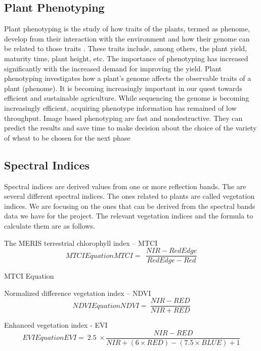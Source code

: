 \documentclass[sigconf, nonacm, natbib, screen, balance=False]{acmart}
\begin{document}
\subsection{Plant Phenotyping}\label{sec:plant_pheno}

Plant phenotyping is the study of how traits of the plants, termed as phenome, develop from their interaction with the environment and how their genome can be related to those traits \cite{minervini}. These traits include, among others, the plant yield, maturity time, plant height, etc. The importance of phenotyping has increased significantly with the increased demand for improving the yield.
Plant phenotyping investigates how a plant's genome affects the observable traits of a plant (phenome). It is becoming increasingly important in our quest towards efficient and sustainable agriculture. While sequencing the genome is becoming increasingly efficient, acquiring phenotype information has remained of low throughput. 
Image based phenotyping are fast and nondestructive. They can predict the results and save time to make decision about the choice of the variety of wheat to be chosen for the next phase

\subsection{Spectral Indices}\label{sec:aspect1}

Spectral indices are derived values from one or more reflection bands. The are several different spectral indices. The ones related to plants are called vegetation indices. We are focusing on the ones that can be derived from the spectral bands data we have for the project. The relevant vegetation indices and the formula to calculate them are as follows.

	The MERIS terrestrial chlorophyll index – MTCI
\begin{displaymath}
  \caption{MTCI Equation}
  \label{eq:mtci}
MTCI=\ \ \frac{NIR-RedEdge}{RedEdge-Red}
\end{displaymath}
  \caption{MTCI Equation}

	Normalized difference vegetation index – NDVI
\begin{displaymath}
  \caption{NDVI Equation}
  \label{eq:ndvi}
NDVI=\ \frac{NIR-RED}{NIR+RED}
\end{displaymath}

	Enhanced vegetation index - EVI
\begin{displaymath}
  \caption{EVI Equation}
  \label{eq:evi}
EVI=\ 2.5\ \times\frac{NIR-RED}{NIR+(6\times R E D)-(7.5\times B L U E)+1}
\end{displaymath}
\end{document}
